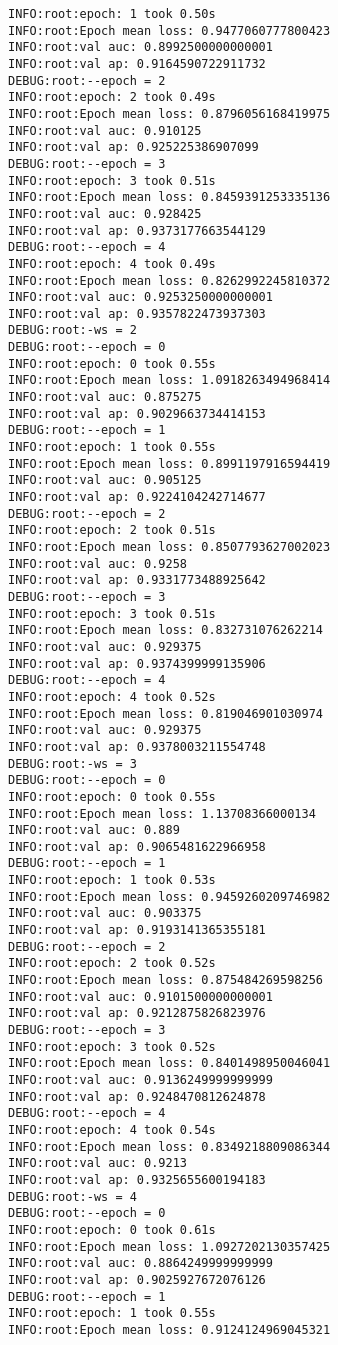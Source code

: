 \documentclass[11pt]{article}
\begin{document}
\begin{verbatim}
INFO:root:epoch: 1 took 0.50s
INFO:root:Epoch mean loss: 0.9477060777800423
INFO:root:val auc: 0.8992500000000001
INFO:root:val ap: 0.9164590722911732
DEBUG:root:--epoch = 2
INFO:root:epoch: 2 took 0.49s
INFO:root:Epoch mean loss: 0.8796056168419975
INFO:root:val auc: 0.910125
INFO:root:val ap: 0.925225386907099
DEBUG:root:--epoch = 3
INFO:root:epoch: 3 took 0.51s
INFO:root:Epoch mean loss: 0.8459391253335136
INFO:root:val auc: 0.928425
INFO:root:val ap: 0.9373177663544129
DEBUG:root:--epoch = 4
INFO:root:epoch: 4 took 0.49s
INFO:root:Epoch mean loss: 0.8262992245810372
INFO:root:val auc: 0.9253250000000001
INFO:root:val ap: 0.9357822473937303
DEBUG:root:-ws = 2
DEBUG:root:--epoch = 0
INFO:root:epoch: 0 took 0.55s
INFO:root:Epoch mean loss: 1.0918263494968414
INFO:root:val auc: 0.875275
INFO:root:val ap: 0.9029663734414153
DEBUG:root:--epoch = 1
INFO:root:epoch: 1 took 0.55s
INFO:root:Epoch mean loss: 0.8991197916594419
INFO:root:val auc: 0.905125
INFO:root:val ap: 0.9224104242714677
DEBUG:root:--epoch = 2
INFO:root:epoch: 2 took 0.51s
INFO:root:Epoch mean loss: 0.8507793627002023
INFO:root:val auc: 0.9258
INFO:root:val ap: 0.9331773488925642
DEBUG:root:--epoch = 3
INFO:root:epoch: 3 took 0.51s
INFO:root:Epoch mean loss: 0.832731076262214
INFO:root:val auc: 0.929375
INFO:root:val ap: 0.9374399999135906
DEBUG:root:--epoch = 4
INFO:root:epoch: 4 took 0.52s
INFO:root:Epoch mean loss: 0.819046901030974
INFO:root:val auc: 0.929375
INFO:root:val ap: 0.9378003211554748
DEBUG:root:-ws = 3
DEBUG:root:--epoch = 0
INFO:root:epoch: 0 took 0.55s
INFO:root:Epoch mean loss: 1.13708366000134
INFO:root:val auc: 0.889
INFO:root:val ap: 0.9065481622966958
DEBUG:root:--epoch = 1
INFO:root:epoch: 1 took 0.53s
INFO:root:Epoch mean loss: 0.9459260209746982
INFO:root:val auc: 0.903375
INFO:root:val ap: 0.9193141365355181
DEBUG:root:--epoch = 2
INFO:root:epoch: 2 took 0.52s
INFO:root:Epoch mean loss: 0.875484269598256
INFO:root:val auc: 0.9101500000000001
INFO:root:val ap: 0.9212875826823976
DEBUG:root:--epoch = 3
INFO:root:epoch: 3 took 0.52s
INFO:root:Epoch mean loss: 0.8401498950046041
INFO:root:val auc: 0.9136249999999999
INFO:root:val ap: 0.9248470812624878
DEBUG:root:--epoch = 4
INFO:root:epoch: 4 took 0.54s
INFO:root:Epoch mean loss: 0.8349218809086344
INFO:root:val auc: 0.9213
INFO:root:val ap: 0.9325655600194183
DEBUG:root:-ws = 4
DEBUG:root:--epoch = 0
INFO:root:epoch: 0 took 0.61s
INFO:root:Epoch mean loss: 1.0927202130357425
INFO:root:val auc: 0.8864249999999999
INFO:root:val ap: 0.9025927672076126
DEBUG:root:--epoch = 1
INFO:root:epoch: 1 took 0.55s
INFO:root:Epoch mean loss: 0.9124124969045321

\end{verbatim}
\end{document}
